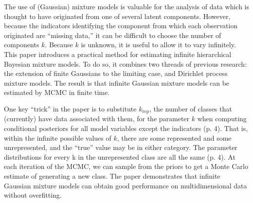 \documentclass[12pt,letterpaper]{article}
\begin{document}



The use of (Gaussian) mixture models is valuable for the analysis of data which is thought to have originated from one of several latent components. However, because the indicators identifying the component from which each observation originated are ``missing data,'' it can be difficult to choose the number of components $k$. Because $k$ is unknown, it is useful to allow it to vary infinitely. This paper introduces a practical method for estimating infinite hierarchical Bayesian mixture models. To do so, it combines two threads of previous research: the extension of finite Gaussians to the limiting case, and Dirichlet process mixture models. The result is that infinite Gaussian mixture models can be estimated by MCMC in finite time. 

One key ``trick'' in the paper is to substitute $k_{\text{rep}}$, the number of classes that (currently) have data associated with them, for the parameter $k$ when computing conditional posteriors for all model variables except the indicators (p. 4). That is, within the infinite possible values of $k$, there are some represented and some unrepresented, and the ``true'' value may be in either category. The parameter distributions for every k in the unrepresented class are all the same (p. 4). At each iteration of the MCMC, we can sample from the priors to get a Monte Carlo estimate of generating a new class. The paper demonstrates that infinite Gaussian mixture models can obtain good performance on multidimensional data without overfitting. 



\end{document}
